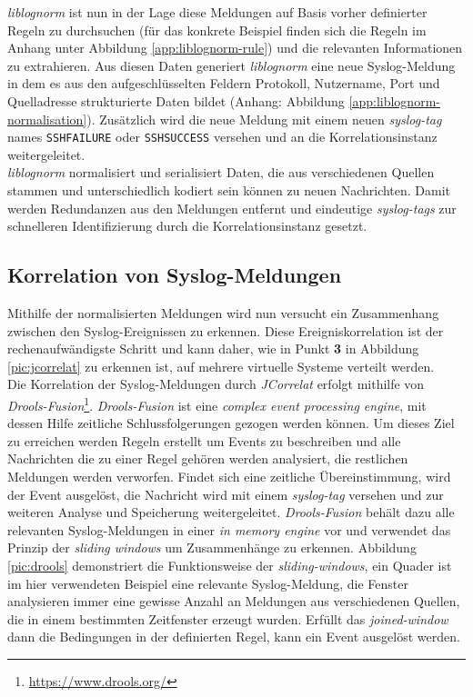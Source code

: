 \textit{liblognorm} ist nun in der Lage diese Meldungen auf Basis vorher definierter 
Regeln zu durchsuchen (für das konkrete Beispiel finden sich die Regeln im Anhang unter 
Abbildung \ref{app:liblognorm-rule}) und die relevanten Informationen zu extrahieren.  
Aus diesen Daten generiert \textit{liblognorm} eine neue Syslog-Meldung in dem es aus den 
aufgeschlüsselten Feldern Protokoll, Nutzername, Port und Quelladresse strukturierte 
Daten bildet (Anhang: Abbildung \ref{app:liblognorm-normalisation}). Zusätzlich wird die 
neue Meldung mit einem neuen \textit{syslog-tag} names \texttt{SSHFAILURE} oder 
\texttt{SSHSUCCESS} versehen und an die Korrelationsinstanz weitergeleitet.\\

\textit{liblognorm} normalisiert und serialisiert Daten, die aus verschiedenen Quellen 
stammen und unterschiedlich kodiert sein können zu neuen Nachrichten. Damit werden 
Redundanzen aus den Meldungen entfernt und eindeutige \textit{syslog-tags} zur 
schnelleren Identifizierung durch die Korrelationsinstanz gesetzt. 


\newpage

\subsection{Korrelation von Syslog-Meldungen}\label{syslog-korrelation}

Mithilfe der normalisierten Meldungen wird nun versucht ein Zusammenhang zwischen den 
Syslog-Ereignissen zu erkennen. Diese Ereigniskorrelation ist der rechenaufwändigste 
Schritt und kann daher, wie in Punkt \textbf{3} in Abbildung \ref{pic:jcorrelat} zu 
erkennen ist, auf mehrere virtuelle Systeme verteilt werden.\\

Die Korrelation der Syslog-Meldungen durch \textit{JCorrelat} erfolgt mithilfe von 
\textit{Drools-Fusion}\footnote{\url{https://www.drools.org/}}. \textit{Drools-Fusion} 
ist eine \textit{complex event processing engine}, mit dessen Hilfe zeitliche 
Schlussfolgerungen gezogen werden können. Um dieses Ziel zu erreichen werden Regeln 
erstellt um Events zu beschreiben und alle Nachrichten die zu einer Regel 
gehören werden analysiert, die restlichen Meldungen werden verworfen. Findet sich eine 
zeitliche Übereinstimmung, wird der Event ausgelöst, die 
Nachricht wird mit einem \textit{syslog-tag} versehen und zur weiteren Analyse und 
Speicherung  weitergeleitet. \textit{Drools-Fusion} behält dazu alle relevanten 
Syslog-Meldungen in einer \textit{in memory engine} vor und verwendet das Prinzip der 
\textit{sliding windows} um Zusammenhänge zu erkennen. Abbildung \ref{pic:drools} 
\cite[Folie 70]{drools-slide} demonstriert die Funktionsweise der 
\textit{sliding-windows}, ein 
Quader ist im hier verwendeten Beispiel eine relevante Syslog-Meldung, die Fenster 
analysieren immer eine gewisse Anzahl an Meldungen aus verschiedenen Quellen, die in 
einem bestimmten Zeitfenster erzeugt wurden. Erfüllt das \textit{joined-window} dann die 
Bedingungen in der definierten Regel, kann ein Event ausgelöst werden.    


